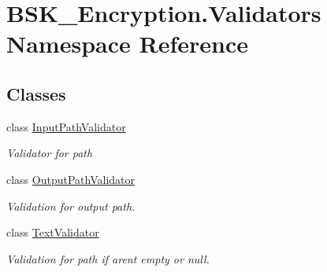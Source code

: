 \hypertarget{namespace_b_s_k___encryption_1_1_validators}{}\section{B\+S\+K\+\_\+\+Encryption.\+Validators Namespace Reference}
\label{namespace_b_s_k___encryption_1_1_validators}
\subsection*{Classes}
\begin{DoxyCompactItemize}
\item 
class \mbox{\hyperlink{class_b_s_k___encryption_1_1_validators_1_1_input_path_validator}{Input\+Path\+Validator}}
\begin{DoxyCompactList}\small\item\em Validator for path \end{DoxyCompactList}\item 
class \mbox{\hyperlink{class_b_s_k___encryption_1_1_validators_1_1_output_path_validator}{Output\+Path\+Validator}}
\begin{DoxyCompactList}\small\item\em Validation for output path. \end{DoxyCompactList}\item 
class \mbox{\hyperlink{class_b_s_k___encryption_1_1_validators_1_1_text_validator}{Text\+Validator}}
\begin{DoxyCompactList}\small\item\em Validation for path if aren\textquotesingle{}t empty or null. \end{DoxyCompactList}\end{DoxyCompactItemize}
